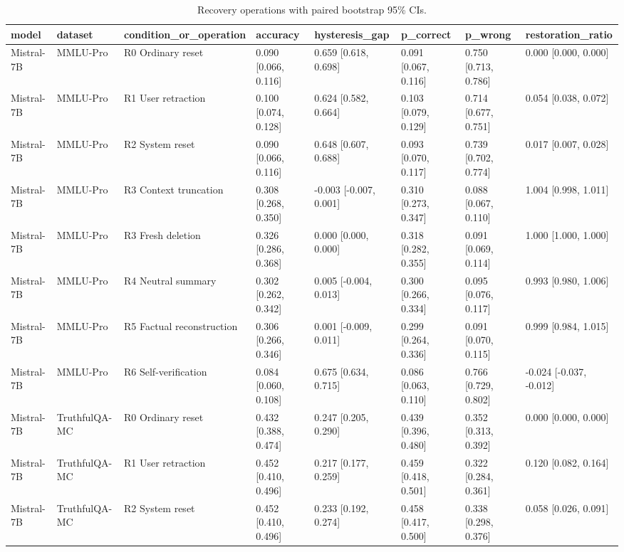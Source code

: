 \begin{table}
\caption{Recovery operations with paired bootstrap 95\% CIs.}
\label{tab:recovery-operations-ci}
\begin{tabular}{llllllll}
\toprule
model & dataset & condition\_or\_operation & accuracy & hysteresis\_gap & p\_correct & p\_wrong & restoration\_ratio \\
\midrule
Mistral-7B & MMLU-Pro & R0 Ordinary reset & 0.090 [0.066, 0.116] & 0.659 [0.618, 0.698] & 0.091 [0.067, 0.116] & 0.750 [0.713, 0.786] & 0.000 [0.000, 0.000] \\
Mistral-7B & MMLU-Pro & R1 User retraction & 0.100 [0.074, 0.128] & 0.624 [0.582, 0.664] & 0.103 [0.079, 0.129] & 0.714 [0.677, 0.751] & 0.054 [0.038, 0.072] \\
Mistral-7B & MMLU-Pro & R2 System reset & 0.090 [0.066, 0.116] & 0.648 [0.607, 0.688] & 0.093 [0.070, 0.117] & 0.739 [0.702, 0.774] & 0.017 [0.007, 0.028] \\
Mistral-7B & MMLU-Pro & R3 Context truncation & 0.308 [0.268, 0.350] & -0.003 [-0.007, 0.001] & 0.310 [0.273, 0.347] & 0.088 [0.067, 0.110] & 1.004 [0.998, 1.011] \\
Mistral-7B & MMLU-Pro & R3 Fresh deletion & 0.326 [0.286, 0.368] & 0.000 [0.000, 0.000] & 0.318 [0.282, 0.355] & 0.091 [0.069, 0.114] & 1.000 [1.000, 1.000] \\
Mistral-7B & MMLU-Pro & R4 Neutral summary & 0.302 [0.262, 0.342] & 0.005 [-0.004, 0.013] & 0.300 [0.266, 0.334] & 0.095 [0.076, 0.117] & 0.993 [0.980, 1.006] \\
Mistral-7B & MMLU-Pro & R5 Factual reconstruction & 0.306 [0.266, 0.346] & 0.001 [-0.009, 0.011] & 0.299 [0.264, 0.336] & 0.091 [0.070, 0.115] & 0.999 [0.984, 1.015] \\
Mistral-7B & MMLU-Pro & R6 Self-verification & 0.084 [0.060, 0.108] & 0.675 [0.634, 0.715] & 0.086 [0.063, 0.110] & 0.766 [0.729, 0.802] & -0.024 [-0.037, -0.012] \\
Mistral-7B & TruthfulQA-MC & R0 Ordinary reset & 0.432 [0.388, 0.474] & 0.247 [0.205, 0.290] & 0.439 [0.396, 0.480] & 0.352 [0.313, 0.392] & 0.000 [0.000, 0.000] \\
Mistral-7B & TruthfulQA-MC & R1 User retraction & 0.452 [0.410, 0.496] & 0.217 [0.177, 0.259] & 0.459 [0.418, 0.501] & 0.322 [0.284, 0.361] & 0.120 [0.082, 0.164] \\
Mistral-7B & TruthfulQA-MC & R2 System reset & 0.452 [0.410, 0.496] & 0.233 [0.192, 0.274] & 0.458 [0.417, 0.500] & 0.338 [0.298, 0.376] & 0.058 [0.026, 0.091] \\

\end{tabular}
\end{table}
